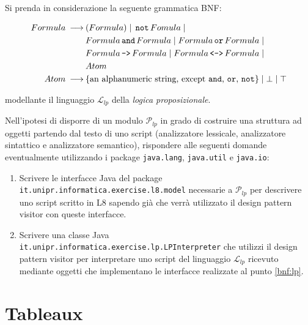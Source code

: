 \documentclass[12pt,a4paper]{article}
\begin{document}
    \begin{Exercise}
    Si prenda in considerazione la seguente grammatica BNF:
    
	\begin{align*}
	Formula \:\longrightarrow\: &(Formula) {\;|\;} \,\texttt{not}\, Fomula {\;|\;}\\
			 & Formula \,\texttt{and}\, Formula {\;|\;} Formula \,\texttt{or}\, Formula {\;|\;}\\
			 & Formula \,\texttt{->}\, Formula {\;|\;} Formula \,\texttt{<->}\, Formula {\;|\;}\\
			 & Atom \\
	Atom \:\longrightarrow\: &\text{\{an alphanumeric string, except \texttt{and}, \texttt{or}, \texttt{not}\}} {\;|\;} \bot {\;|\;} \top
	\end{align*}
	
	modellante il linguaggio $\mathcal{L}_{lp}$ della \textit{logica proposizionale}.
	
	Nell’ipotesi di disporre di un modulo $\mathcal{P}_{lp}$ in grado di
	costruire una struttura ad oggetti partendo dal testo di uno script
	(analizzatore lessicale, analizzatore sintattico e analizzatore 
	semantico),	rispondere alle seguenti domande eventualmente utilizzando 
	i package \texttt{java.lang}, \texttt{java.util} e \texttt{java.io}:
	
	\begin{enumerate}
	\item\label{bnf:lp} Scrivere le interfacce Java del package
		\texttt{it.unipr.informatica.exercise.l8.model} necessarie a 
		$\mathcal{P}_{lp}$ per 
		descrivere uno script scritto in L8 sapendo già che verrà utilizzato 
		il design pattern visitor con queste interfacce.
	
	\item Scrivere una classe Java \texttt{it.unipr.informatica.exercise.lp.LPInterpreter} che utilizzi il
design pattern visitor per interpretare uno script del linguaggio $\mathcal{L}_{lp}$ ricevuto mediante oggetti che implementano le interfacce realizzate al punto \ref{bnf:lp}.
	\end{enumerate}
    
    \end{Exercise}


\clearpage
\section{Tableaux}
\end{document}
